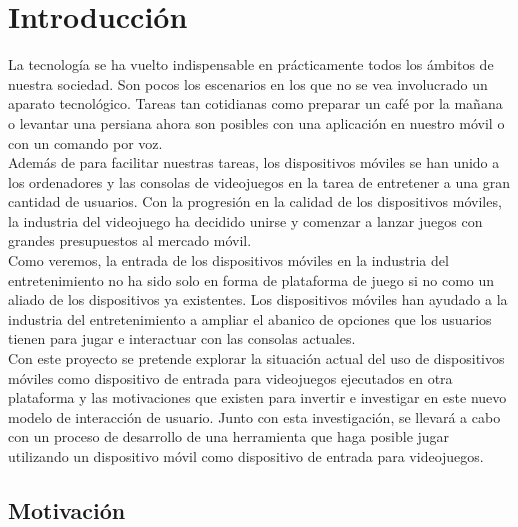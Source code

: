 %
%




\chapter{Introducci\'on}

La tecnolog\'ia se ha vuelto indispensable en pr\'acticamente todos los \'ambitos de nuestra sociedad. Son pocos los escenarios  en los que no se vea involucrado un aparato tecnol\'ogico. Tareas tan cotidianas como preparar un caf\'e por la ma\~nana o levantar una persiana ahora son posibles con una aplicaci\'on en nuestro m\'ovil o con un comando por voz. \\

Adem\'as de para facilitar nuestras tareas, los dispositivos m\'oviles se han unido a los ordenadores y las consolas de videojuegos en la tarea de entretener a una gran cantidad de usuarios. Con la progresi\'on en la calidad de los dispositivos m\'oviles, la industria del videojuego ha decidido unirse y comenzar a lanzar juegos con grandes presupuestos al mercado m\'ovil. \\

Como veremos, la entrada de los dispositivos m\'oviles en la industria del entretenimiento no ha sido solo en forma de plataforma de juego si no como un aliado de los dispositivos ya existentes. Los dispositivos m\'oviles han ayudado a la industria del entretenimiento a ampliar el abanico de opciones que los usuarios tienen para jugar e interactuar con las consolas actuales. \\


Con este proyecto se pretende explorar la situaci\'on actual del uso de dispositivos m\'oviles como dispositivo de entrada para videojuegos ejecutados en otra plataforma y las motivaciones que existen para invertir e investigar en este nuevo modelo de interacci\'on de usuario. Junto con esta investigaci\'on, se llevar\'a a cabo con un proceso de desarrollo de una herramienta que haga posible jugar utilizando un dispositivo m\'ovil como dispositivo de entrada para videojuegos.


\section{Motivaci\'on}


